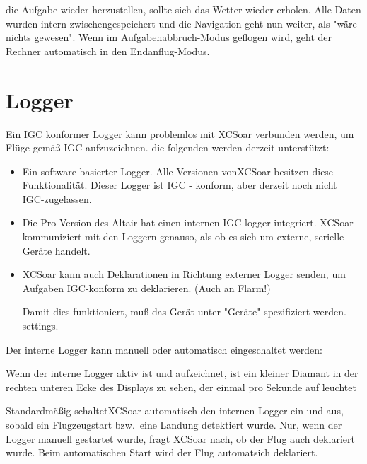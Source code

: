 \begin{quote}
\blink{}\blink{}
\end{quote}

die Aufgabe wieder herzustellen, sollte sich das Wetter wieder erholen.
Alle Daten wurden intern zwischengespeichert und die Navigation geht nun weiter, als "wäre nichts gewesen".
%
\textcolor[rgb]{0.00,0.25,0.50}{\textsf{Wenn im Aufgabenabbruch-Modus geflogen wird, geht der Rechner automatisch in den  Endanflug-Modus.}}
%
\section{Logger}

Ein IGC konformer Logger kann problemlos mit \textsf{XCSoar} verbunden werden, um Flüge gemäß IGC aufzuzeichnen. die folgenden werden derzeit unterstützt:

\begin{itemize}
\item Ein software basierter Logger.  Alle Versionen von\textsf{XCSoar}  besitzen diese Funktionalität.  Dieser Logger ist IGC - konform, aber derzeit noch nicht IGC-zugelassen.
\item Die Pro Version des Altair hat einen internen IGC logger integriert.
\textsf{XCSoar} kommuniziert mit den Loggern genauso, als ob es sich um externe, serielle Geräte handelt.
\item\textsf{XCSoar} kann auch Deklarationen in Richtung externer Logger senden, um Aufgaben IGC-konform zu deklarieren. (Auch an Flarm!)

Damit dies funktioniert, muß das Gerät unter "Geräte" spezifiziert werden.  settings.
\end{itemize}

Der interne Logger kann manuell oder automatisch eingeschaltet werden:

\begin{quote}
\blink{}\blink{}
\end{quote}

Wenn der interne Logger aktiv ist und aufzeichnet, ist ein kleiner Diamant
in der rechten unteren Ecke des Displays zu sehen, der einmal pro Sekunde auf leuchtet

Standardmäßig schaltet\textsf{XCSoar}  automatisch den internen Logger ein und aus, sobald ein Flugzeugstart bzw.\ eine Landung  detektiert wurde.
Nur, wenn der Logger manuell gestartet wurde, fragt \textsf{XCSoar} nach, ob der Flug auch deklariert wurde. Beim automatischen Start wird der Flug automatsich deklariert.

